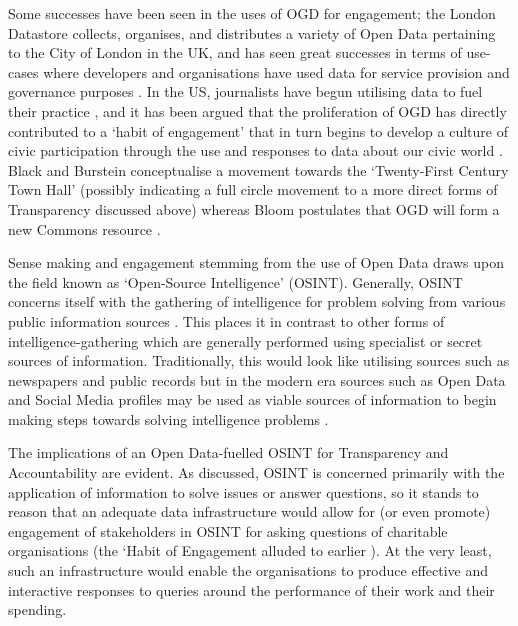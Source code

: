 Some successes have been seen in the uses of OGD for engagement; the London Datastore \cite{noauthor_london_nodate} collects, organises, and distributes a variety of Open Data pertaining to the City of London in the UK, and has seen great successes in terms of use-cases where developers and organisations have used data for service provision and governance purposes \cite{coleman_lessons_2013}. In the US, journalists have begun utilising data to fuel their practice \cite{ramos_journalists_2013}, and it has been argued that the proliferation of OGD has directly contributed to a `habit of engagement' that in turn begins to develop a culture of civic participation through the use and responses to data about our civic world \cite{gordon_making_2013-1}. Black and Burstein conceptualise a movement towards the `Twenty-First Century Town Hall' \cite{black_local_2013} (possibly indicating a full circle movement to a more direct forms of Transparency discussed above) whereas Bloom postulates that OGD will form a new Commons resource \cite{bloom_towards_2013}.

Sense making and engagement stemming from the use of Open Data draws upon the field known as `Open-Source Intelligence' (OSINT). Generally, OSINT concerns itself with the gathering of intelligence for problem solving from various public information sources \cite{bradbury_plain_2011, glassman_intelligence_2012}. This places it in contrast to other forms of intelligence-gathering which are generally performed using specialist or secret sources of information. Traditionally, this would look like utilising sources such as newspapers and public records but in the modern era sources such as Open Data and Social Media profiles may be used as viable sources of information to begin making steps towards solving intelligence problems \cite{bizer_emerging_2009}.

The implications of an Open Data-fuelled OSINT for Transparency and Accountability are evident. As discussed, OSINT is concerned primarily with the application of information to solve issues or answer questions, so it stands to reason that an adequate data infrastructure would allow for (or even promote) engagement of stakeholders in OSINT for asking questions of charitable organisations (the `Habit of Engagement alluded to earlier \cite{gordon_making_2013-1}). At the very least, such an infrastructure would enable the organisations to produce effective and interactive responses to queries around the performance of their work and their spending. 

